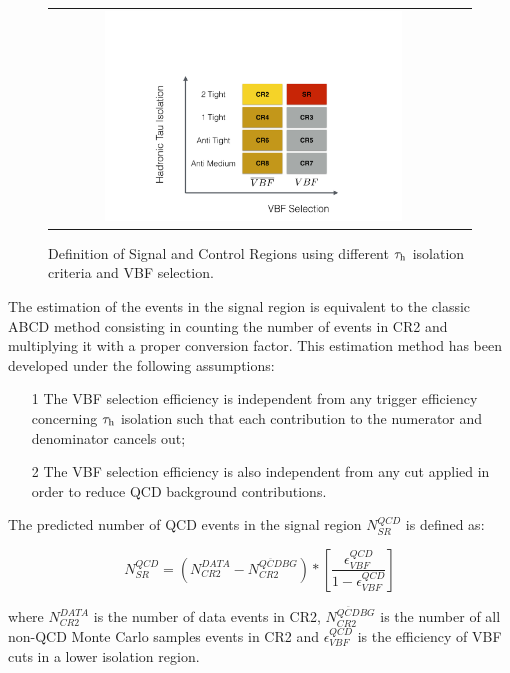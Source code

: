 \begin{figure}[tbh!]
	\centering
	\begin{tabular}{cc}
		\includegraphics[width=0.75\textwidth]{PLOTS/diTauHadLSotherPlots/controlregions.pdf}
	\end{tabular}
	\caption{Definition of Signal and Control Regions using different $\tau_{\text{h}}$ isolation criteria and VBF selection.}
	\label{fig:crs}
\end{figure}

The estimation of the events in the signal region is equivalent to the classic ABCD method consisting in counting the number of events in CR2 and multiplying it with a proper conversion factor. This estimation method has been developed under the following assumptions:

\begin{itemize}
	\item[1] The VBF selection efficiency is independent from any trigger efficiency concerning $\tau_{\text{h}}$ isolation such that each contribution to the numerator and denominator cancels out;
	\item[2] The VBF selection efficiency is also independent from any \met cut applied in order to reduce QCD background contributions. 
\end{itemize}

The predicted number of QCD events in the signal region $N^{QCD}_{SR}$ is defined as:

\begin{equation}
N^{QCD}_{SR} = \left( N^{DATA}_{CR2} - N^{\overline{QCD} BG}_{CR2} \right) * \left[ \frac{\epsilon^{QCD}_{VBF}}{1 - \epsilon^{QCD}_{VBF}} \right]
\label{eq:qcdbgpred}
\end{equation}

where $N^{DATA}_{CR2}$ is the number of data events in CR2, $N^{\overline{QCD} BG}_{CR2}$ is the number of all non-QCD Monte Carlo samples events in CR2 and $\epsilon^{QCD}_{VBF}$ is the efficiency of VBF cuts in a lower \hadtau isolation region. 


